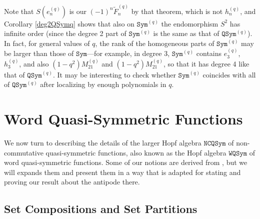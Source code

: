 \documentclass{article}
\theoremstyle{definition}
\begin{document}
Note that $S(e_{n}^{(q)})$ is our $(-1)^{n}\widetilde{F}_{n}^{(q)}$ by that theorem, which is not $h_{n}^{(q)}$, and Corollary \ref{deg2QSymq} shows that also on $\mathtt{Sym}^{(q)}$ the endomorphism $S^{2}$ has infinite order (since the degree 2 part of $\mathtt{Sym}^{(q)}$ is the same as that of $\mathtt{QSym}^{(q)}$). In fact, for general values of $q$, the rank of the homogeneous parts of $\mathtt{Sym}^{(q)}$ may be larger than those of $\mathtt{Sym}$---for example, in degree 3, $\mathtt{Sym}^{(q)}$ contains $e_{3}^{(q)}$, $h_{3}^{(q)}$, and also $(1-q^{2})M_{21}^{(q)}$ and $(1-q^{2})M_{21}^{(q)}$, so that it has degree 4 like that of $\mathtt{QSym}^{(q)}$. It may be interesting to check whether $\mathtt{Sym}^{(q)}$ coincides with all of $\mathtt{QSym}^{(q)}$ after localizing by enough polynomials in $q$.

\section{Word Quasi-Symmetric Functions \label{NCQSym}}

We now turn to describing the details of the larger Hopf algebra $\mathtt{NCQSym}$ of non-commutative quasi-symmetric functions, also known as the Hopf algebra $\mathtt{WQSym}$ of word quasi-symmetric functions. Some of our notions are derived from \cite{[BZ]}, but we will expands them and present them in a way that is adapted for stating and proving our result about the antipode there.

\subsection{Set Compositions and Set Partitions}
\end{document}
